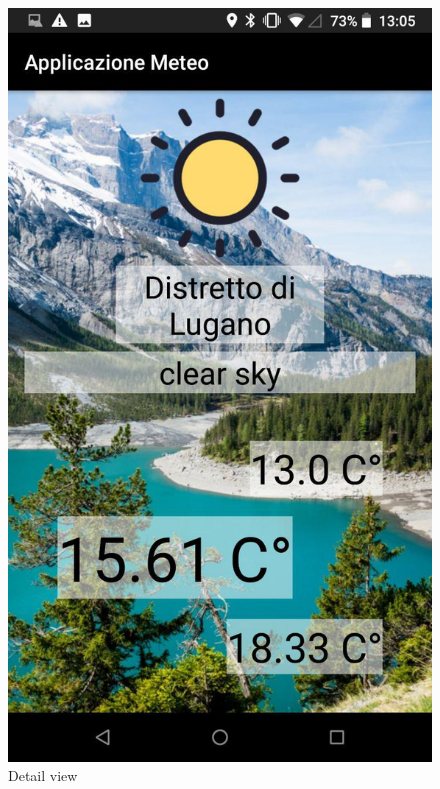 \documentclass{article}
\begin{document}
\begin{figure}[!htb]
      \includegraphics[width=\linewidth]{images/sc3.jpg}
      \caption{Detail view}\label{fig:awesome_image2}
    \endminipage\hfill

\end{figure}
\end{document}
